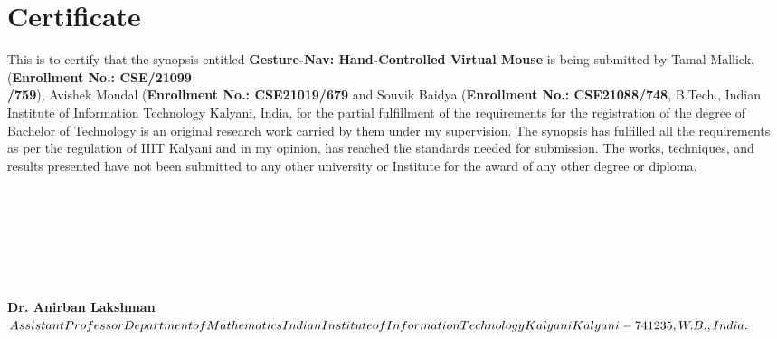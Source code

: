 \documentclass[12pt,a4paper]{report}
\begin{document}
%
	\newpage
	\chapter*{\centering Certificate}
\label{sec:engack}
This is to certify that the synopsis entitled \textbf{Gesture-Nav: Hand-Controlled Virtual Mouse} is being submitted by Tamal Mallick,
 (\textbf{Enrollment No.: CSE/21099\\/759}), Avishek Mondal (\textbf{Enrollment No.: CSE21019/679} and Souvik Baidya (\textbf{Enrollment No.: CSE21088/748}, B.Tech., Indian Institute of Information Technology Kalyani, India, for the partial fulfillment of the requirements for the registration of the degree of Bachelor of Technology is an original research work carried by them under my supervision. The synopsis has fulfilled all the requirements as per the regulation of IIIT Kalyani and in my opinion, has reached the standards needed for submission. The works, techniques, and results presented have not been submitted to any other university or Institute for the award of any other degree or diploma.
\\
\\
\\
\\
\\
\\
\\
\\
\textbf{Dr. Anirban Lakshman}  \\ 
$Assistant Professor \\  
Department of Mathematics\\
Indian Institute of Information Technology Kalyani\\
Kalyani-741235, W.B., India.
$
\cleardoublepage
\end{document}
